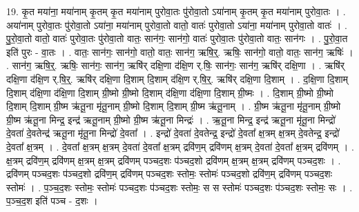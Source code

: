 \documentclass[17pt]{extarticle}
\begin{document}
19. कृ॒त मया॑ना॒ मया॑नाम् कृ॒तम् कृ॒त मया॑नाम् पुरोवा॒तः पु॑रोवा॒तो ऽया॑नाम् कृ॒तम् कृ॒त मया॑नाम् पुरोवा॒तः । . अया॑नाम् पुरोवा॒तः पु॑रोवा॒तो ऽया॑ना॒ मया॑नाम् पुरोवा॒तो वातो॒ वातः॑ पुरोवा॒तो ऽया॑ना॒ मया॑नाम् पुरोवा॒तो वातः॑ । . पु॒रो॒वा॒तो वातो॒ वातः॑ पुरोवा॒तः पु॑रोवा॒तो वातः॒ सान॑गः॒ सान॑गो॒ वातः॑ पुरोवा॒तः पु॑रोवा॒तो वातः॒ सान॑गः । . पु॒रो॒वा॒त इति॑ पुरः - वा॒तः । . वातः॒ सान॑गः॒ सान॑गो॒ वातो॒ वातः॒ सान॑ग॒ ऋषि॒र्॒. ऋषिः॒ सान॑गो॒ वातो॒ वातः॒ सान॑ग॒ ऋषिः॑ । . सान॑ग॒ ऋषि॒र्॒. ऋषिः॒ सान॑गः॒ सान॑ग॒ ऋषि॑र् दक्षि॒णा द॑क्षि॒ण र्.षिः॒ सान॑गः॒ सान॑ग॒ ऋषि॑र् दक्षि॒णा । . ऋषि॑र् दक्षि॒णा द॑क्षि॒ण र्.षि॒र्॒. ऋषि॑र् दक्षि॒णा दि॒शाम् दि॒शाम् द॑क्षि॒ण र्.षि॒र्॒. ऋषि॑र् दक्षि॒णा दि॒शाम् । . द॒क्षि॒णा दि॒शाम् दि॒शाम् द॑क्षि॒णा द॑क्षि॒णा दि॒शाम् ग्री॒ष्मो ग्री॒ष्मो दि॒शाम् द॑क्षि॒णा द॑क्षि॒णा दि॒शाम् ग्री॒ष्मः । . दि॒शाम् ग्री॒ष्मो ग्री॒ष्मो दि॒शाम् दि॒शाम् ग्री॒ष्म ऋ॑तू॒ना मृ॑तू॒नाम् ग्री॒ष्मो दि॒शाम् दि॒शाम् ग्री॒ष्म ऋ॑तू॒नाम् । . ग्री॒ष्म ऋ॑तू॒ना मृ॑तू॒नाम् ग्री॒ष्मो ग्री॒ष्म ऋ॑तू॒ना मिन्द्र॒ इन्द्र॑ ऋतू॒नाम् ग्री॒ष्मो ग्री॒ष्म ऋ॑तू॒ना मिन्द्रः॑ । . ऋ॒तू॒ना मिन्द्र॒ इन्द्र॑ ऋतू॒ना मृ॑तू॒ना मिन्द्रो॑ दे॒वता॑ दे॒वतेन्द्र॑ ऋतू॒ना मृ॑तू॒ना मिन्द्रो॑ दे॒वता᳚ । . इन्द्रो॑ दे॒वता॑ दे॒वतेन्द्र॒ इन्द्रो॑ दे॒वता᳚ क्ष॒त्रम् क्ष॒त्रम् दे॒वतेन्द्र॒ इन्द्रो॑ दे॒वता᳚ क्ष॒त्रम् । . दे॒वता᳚ क्ष॒त्रम् क्ष॒त्रम् दे॒वता॑ दे॒वता᳚ क्ष॒त्रम् द्रवि॑ण॒म् द्रवि॑णम् क्ष॒त्रम् दे॒वता॑ दे॒वता᳚ क्ष॒त्रम् द्रवि॑णम् । . क्ष॒त्रम् द्रवि॑ण॒म् द्रवि॑णम् क्ष॒त्रम् क्ष॒त्रम् द्रवि॑णम् पञ्चद॒शः प॑ञ्चद॒शो द्रवि॑णम् क्ष॒त्रम् क्ष॒त्रम् द्रवि॑णम् पञ्चद॒शः । . द्रवि॑णम् पञ्चद॒शः प॑ञ्चद॒शो द्रवि॑ण॒म् द्रवि॑णम् पञ्चद॒शः स्तोमः॒ स्तोमः॑ पञ्चद॒शो द्रवि॑ण॒म् द्रवि॑णम् पञ्चद॒शः स्तोमः॑ । . प॒ञ्च॒द॒शः स्तोमः॒ स्तोमः॑ पञ्चद॒शः प॑ञ्चद॒शः स्तोमः॒ स स स्तोमः॑ पञ्चद॒शः प॑ञ्चद॒शः स्तोमः॒ सः । . प॒ञ्च॒द॒श इति॑ पञ्च - द॒शः । \newline
\end{document}
